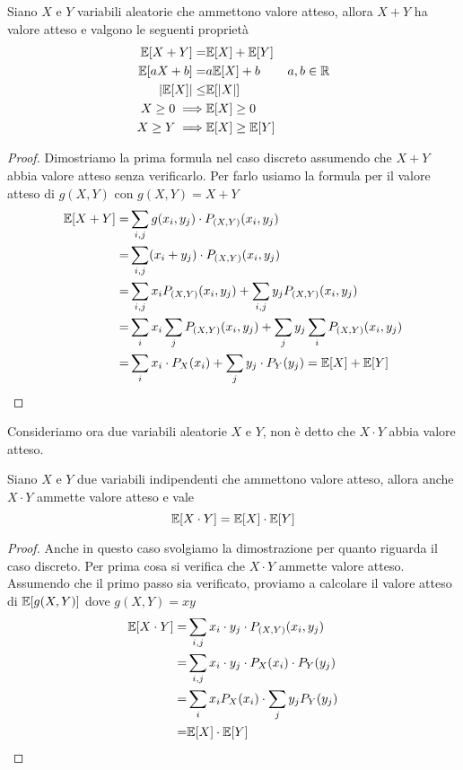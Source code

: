 \begin{proposition}
	Siano $X$ e $Y$ variabili aleatorie che ammettono valore atteso, allora $X+Y$ ha valore atteso
	e valgono le seguenti proprietà
	\begin{align*}
		\mathbb{E}[X+Y] =         & \mathbb{E}[X] + \mathbb{E}[Y]                 \\
		\mathbb{E}[aX + b] =      & a \mathbb{E}[X] + b      & a,b \in \mathbb{R} \\
		|\mathbb{E}[X]| \leq      & \mathbb{E}[|X|]                       \\
		X \geq 0 \implies & \mathbb{E}[X] \geq 0                  \\
		X \geq Y \implies & \mathbb{E}[X] \geq \mathbb{E}[Y]
	\end{align*}
	\begin{proof}
		Dimostriamo la prima formula nel caso discreto assumendo che $X+Y$ abbia valore atteso
		senza verificarlo. Per farlo usiamo la formula per il valore atteso di $g(X,Y)$ con
		$g(X,Y) = X+Y$
		\begin{align*}
			\mathbb{E}[X+Y] = & \sum_{i,j} g(x_i, y_j) \cdot P_{(X, Y)} (x_i, y_j)                    \\
			=         & \sum_{i,j} (x_i + y_j) \cdot P_{(X,Y)} (x_i, y_j)                     \\
			=         & \sum_{i,j} x_i P_{(X,Y)} (x_i, y_j) +
			\sum_{i,j} y_j P_{(X,Y)} (x_i, y_j)                                               \\
			=         & \sum_i x_i \sum_j P_{(X,Y)} (x_i, y_j) +
			\sum_j y_j \sum_i P_{(X,Y)} (x_i, y_j)                                            \\
			=         & \sum_i x_i \cdot P_X(x_i) + \sum_j y_j \cdot P_Y(y_j) = \mathbb{E}[X] + \mathbb{E}[Y]
		\end{align*}
	\end{proof}
\end{proposition}

Consideriamo ora due variabili aleatorie $X$ e $Y$, non è detto che $X \cdot Y$ abbia valore
atteso.

\begin{proposition}
	Siano $X$ e $Y$ due variabili indipendenti che ammettono valore atteso, allora anche $X\cdot Y$
	ammette valore atteso e vale
	\[ \mathbb{E}[X \cdot Y] = \mathbb{E}[X] \cdot \mathbb{E}[Y] \]
	\begin{proof}
		Anche in questo caso svolgiamo la dimostrazione per quanto riguarda il caso discreto. Per
		prima cosa si verifica che $X \cdot Y$ ammette valore atteso. Assumendo che il primo passo
		sia verificato, proviamo a calcolare il valore atteso di $\mathbb{E}[g(X,Y)]$ dove $g(X,Y)=xy$
		\begin{align*}
			\mathbb{E}[X \cdot Y] = & \sum_{i,j} x_i \cdot y_j \cdot P_{(X,Y)} (x_i, y_j)    \\
			=               & \sum_{i,j} x_i \cdot y_j \cdot P_X(x_i) \cdot P_Y(y_j) \\
			=               & \sum_i x_i P_X (x_i) \cdot \sum_j y_j P_Y(y_j)         \\
			=               & \mathbb{E}[X] \cdot \mathbb{E}[Y]
		\end{align*}
	\end{proof}
\end{proposition}

